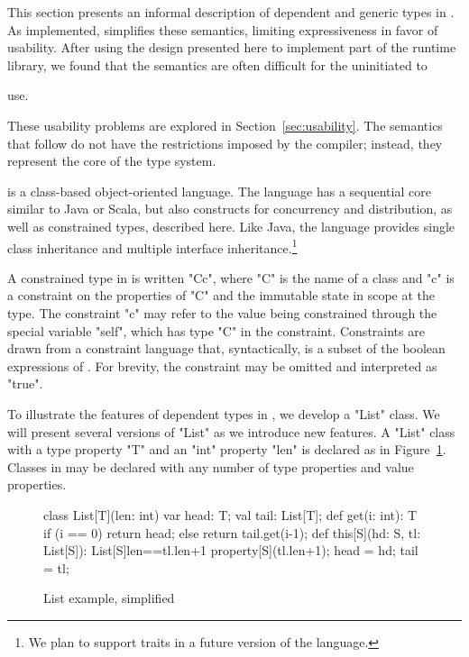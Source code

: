 
\newif\ifwild
\wildfalse

This section presents an informal description of 
dependent and generic types in \Xten{}.  
As implemented, \Xten simplifies these 
semantics, limiting expressiveness in favor of usability.
After
using the design presented here to implement part of the \Xten runtime library,
we found that the semantics are
often difficult for the uninitiated to
\ifwild
use---indeed, they
provide comparable expressive power to Java wildcards, whose usability
issues are well-known~\cite{wildcards-are-evil}.
\else
use.
\fi
These usability problems are explored in Section~\ref{sec:usability}.
The semantics that follow do not have the restrictions
imposed by the \Xten compiler; instead, they represent the core
of the \Xten type system.

\Xten{} is a class-based object-oriented language.
The language has a sequential core similar to Java or Scala, but
also
constructs for concurrency and distribution, as well as constrained
types, described here.  Like Java, the language provides single class
inheritance and multiple interface inheritance.\footnote{We plan
to support traits in a future version of the language.}

A constrained type in \Xten{} is written \xcd"C{c}", where \xcd"C" is the
name of a class and \xcd"c" is a constraint on the properties
of \xcd"C" and the immutable state in scope at the type.  The
constraint \xcd"c" may refer to the value being constrained through
the special variable \xcd"self", which has type \xcd"C" in the
constraint.  Constraints are drawn from a constraint language that,
syntactically, is a subset of the boolean expressions of \Xten{}.  For
brevity, the constraint may be omitted and interpreted as \xcd"true".

To illustrate the features of dependent types in \Xten{}, we
develop a \xcd"List"
class.  We will present several versions of \xcd"List" as we
introduce new features.
A \xcd"List" class with a type property \xcd"T" and an \xcd"int"
property \xcd"len" is declared as in Figure~\ref{fig:list0}.
Classes in \Xten{} may be declared with any number of type properties and
value properties.

\begin{figure}
{
\begin{xtennoindent}
    class List[T](len: int) {
      var head: T;
      val tail: List[T];
      def get(i: int): T {
        if (i == 0) return head;
        else return tail.get(i-1);
      }
      def this[S](hd: S, tl: List[S]):
          List[S]{len==tl.len+1} {
        property[S](tl.len+1);
        head = hd; tail = tl;
      }
    }
\end{xtennoindent}
}
\caption{List example, simplified}
\label{fig:list0}
\end{figure}

